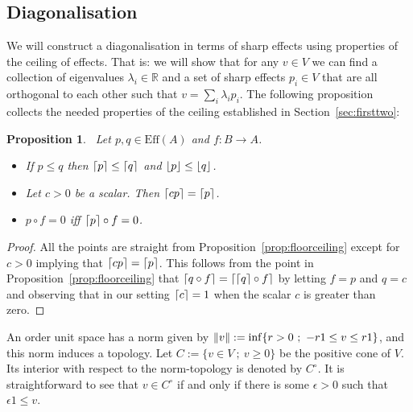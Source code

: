 \documentclass[a4paper,onecolumn,10pt,accepted=2019-05-03, issue=1, volume=1, shorttitle=papers/compositionality-1-1]{compositionalityarticle}
\DeclarePairedDelimiter{\ceil}{\lceil}{\rceil}
\DeclarePairedDelimiter{\floor}{\lfloor}{\rfloor}
\newcounter{counter}
\numberwithin{counter}{section}
\newtheorem{proposition}[counter]{Proposition}
\newcommand{\R}{\mathbb{R}}
\newcommand{\pred}{\text{Eff}}
\begin{document}
\subsection{Diagonalisation}\label{sec:diagonalisation}
We will construct a diagonalisation in terms of sharp effects using properties of the ceiling of effects. That is: we will show that for any $v\in V$ we can find a collection of eigenvalues $\lambda_i\in \R$ and a set of sharp effects $p_i\in V$ that are all orthogonal to each other such that $v=\sum_i \lambda_i p_i$. The following proposition collects the needed properties of the ceiling established in Section~\ref{sec:firsttwo}:
\begin{proposition}~\label{prop:ceilings}
	Let $p,q\in \pred(A)$  and $f:B\rightarrow A$.
	\begin{itemize}
		\item If $p\leq q$ then $\ceil{p}\leq \ceil{q}$ and $\floor{p}\leq \floor{q}$.
		\item Let $c>0$ be a scalar. Then $\ceil{cp}=\ceil{p}$.
		\item $p\circ f = 0$ iff $\ceil{p}\circ f = 0$.
	\end{itemize}
\end{proposition}
\begin{proof}
	All the points are straight from Proposition~\ref{prop:floorceiling} except for $c>0$ implying that $\ceil{cp}=\ceil{p}$. This follows from the point in Proposition~\ref{prop:floorceiling} that $\ceil{q\circ f}=\ceil{\ceil{q}\circ f}$ by letting $f=p$ and $q=c$ and observing that in our setting $\ceil{c}=1$ when the scalar $c$ is greater than zero.
\end{proof}

An order unit space has a norm given by $\norm{v}:=\inf\{r>0~;~-r1\leq v\leq r1\}$, and this norm induces a topology. Let $C := \{v\in V~;~ v\geq 0\}$ be the positive cone of $V$. Its interior with respect to the norm-topology is denoted by $C^\circ$. It is straightforward to see that $v\in C^\circ$ if and only if there is some $\epsilon>0$ such that $\epsilon 1 \leq v$.
\end{document}

